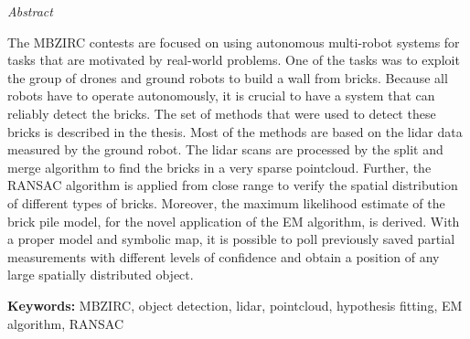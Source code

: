 \vfill
\begin{center}
{\it \large Abstract}
\vspace{0.2cm}

\begin{minipage}{0.8\textwidth}{
The MBZIRC contests are focused on using autonomous multi-robot systems for tasks that are motivated by real-world problems. One of the tasks was to exploit the group of drones and ground robots to build a wall from bricks. Because all robots have to operate autonomously, it is crucial to have a system that can reliably detect the bricks. The set of methods that were used to detect these bricks is described in the thesis. Most of the methods are based on the lidar data measured by the ground robot. The lidar scans are processed by the split and merge algorithm to find the bricks in a very sparse pointcloud. Further, the RANSAC algorithm is applied from close range to verify the spatial distribution of different types of bricks. Moreover, the maximum likelihood estimate of the brick pile model, for the novel application of the EM algorithm, is derived. With a proper model and symbolic map, it is possible to poll previously saved partial measurements with different levels of confidence and obtain a position of any large spatially distributed object.
\vspace{3mm}
\par \textbf{Keywords:} MBZIRC, object detection, lidar, pointcloud, hypothesis fitting, EM algorithm, RANSAC
}
\end{minipage}
\end{center}
\vfill
\vspace{1cm}
